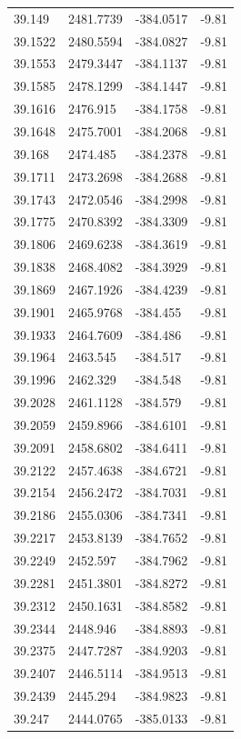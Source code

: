 \begin{table}[H]
\begin{tabular}{llll}
39.149 & 2481.7739 & -384.0517 & -9.81 \\
39.1522 & 2480.5594 & -384.0827 & -9.81 \\
39.1553 & 2479.3447 & -384.1137 & -9.81 \\
39.1585 & 2478.1299 & -384.1447 & -9.81 \\
39.1616 & 2476.915 & -384.1758 & -9.81 \\
39.1648 & 2475.7001 & -384.2068 & -9.81 \\
39.168 & 2474.485 & -384.2378 & -9.81 \\
39.1711 & 2473.2698 & -384.2688 & -9.81 \\
39.1743 & 2472.0546 & -384.2998 & -9.81 \\
39.1775 & 2470.8392 & -384.3309 & -9.81 \\
39.1806 & 2469.6238 & -384.3619 & -9.81 \\
39.1838 & 2468.4082 & -384.3929 & -9.81 \\
39.1869 & 2467.1926 & -384.4239 & -9.81 \\
39.1901 & 2465.9768 & -384.455 & -9.81 \\
39.1933 & 2464.7609 & -384.486 & -9.81 \\
39.1964 & 2463.545 & -384.517 & -9.81 \\
39.1996 & 2462.329 & -384.548 & -9.81 \\
39.2028 & 2461.1128 & -384.579 & -9.81 \\
39.2059 & 2459.8966 & -384.6101 & -9.81 \\
39.2091 & 2458.6802 & -384.6411 & -9.81 \\
39.2122 & 2457.4638 & -384.6721 & -9.81 \\
39.2154 & 2456.2472 & -384.7031 & -9.81 \\
39.2186 & 2455.0306 & -384.7341 & -9.81 \\
39.2217 & 2453.8139 & -384.7652 & -9.81 \\
39.2249 & 2452.597 & -384.7962 & -9.81 \\
39.2281 & 2451.3801 & -384.8272 & -9.81 \\
39.2312 & 2450.1631 & -384.8582 & -9.81 \\
39.2344 & 2448.946 & -384.8893 & -9.81 \\
39.2375 & 2447.7287 & -384.9203 & -9.81 \\
39.2407 & 2446.5114 & -384.9513 & -9.81 \\
39.2439 & 2445.294 & -384.9823 & -9.81 \\
39.247 & 2444.0765 & -385.0133 & -9.81 \\

\end{tabular}
\end{table}
